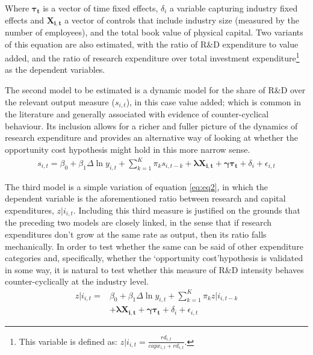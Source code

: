 \documentclass{_latex/house}
\begin{document}
Where $\boldsymbol{\tau_{t}}$ is a vector of time fixed effects, $\delta_{i}$ a variable capturing industry fixed effects and $\boldsymbol{X_{i,t}}$ a vector of controls that include industry size (measured by the number of employees), and the total book value of physical capital. Two variants of this equation are also estimated, with the ratio of R\&D expenditure to value added, and the ratio of research expenditure over total investment expenditure\footnote{This variable is defined as: $z|i_{i,t}=\frac{rd_{i,t}}{capx_{i,t}+rd_{i,t}}$.} as the dependent variables.

The second model to be estimated is a dynamic model for the share of R\&D over the relevant output measure ($s_{i,t}$), in this case value added; which is common in the literature and generally associated with evidence of counter-cyclical behaviour. Its inclusion allows for a richer and fuller picture of the dynamics of research expenditure and provides an alternative way of looking at whether the opportunity cost hypothesis might hold in this more narrow sense.
\begin{align} \label{eq:eq2}
s_{i,t}=\beta_{0}+\beta_{1} \Delta \ln y_{i,t}+\sum_{k=1}^{K} \pi_{k} s_{i,t-k}+\boldsymbol{\lambda X_{i,t}}+\boldsymbol{\gamma \tau_{t}}+\delta_{i}+\epsilon_{i,t}
\end{align}

The third model is a simple variation of equation \ref{eq:eq2}, in which the dependent variable is the aforementioned ratio between research and capital expenditures, $z|i_{i,t}$. Including this third measure is justified on the grounds that the preceding two models are closely linked, in the sense that if research expenditures don't grow at the same rate as output, then its ratio falls mechanically. In order to test whether the same can be said of other expenditure categories and, specifically, whether the \textquoteleft opportunity cost\textquoteright\:hypothesis is validated in some way, it is natural to test whether this measure of R\&D intensity behaves counter-cyclically at the industry level.
\begin{align}
z|i_{i,t}={}&\beta_{0}+\beta_{1} \Delta \ln y_{i,t}+\sum_{k=1}^{K} \pi_{k} z|i_{i,t-k} \nonumber \\
&+\boldsymbol{\lambda X_{i,t}}+\boldsymbol{\gamma \tau_{t}}+\delta_{i}+\epsilon_{i,t} \label{eq:eq3}
\end{align}
\end{document}
